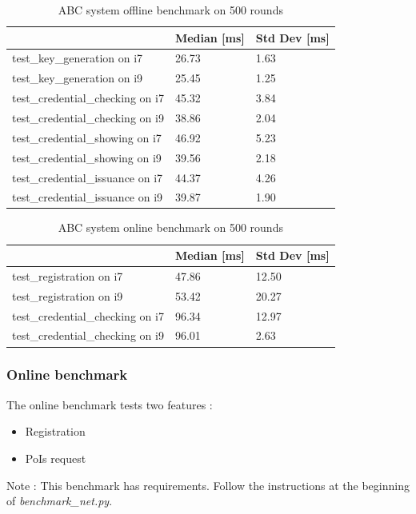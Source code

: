 \documentclass[10pt,conference,compsocconf]{IEEEtran}
\begin{document}
\begin{table}[]
\centering
\begin{tabular}{|l|l|l|}
\hline
                                 & Median [ms] & Std Dev [ms] \\ \hline
test\_key\_generation on i7      & 26.73  & 1.63    \\ \hline
test\_key\_generation on i9      & 25.45  & 1.25    \\ \hline
test\_credential\_checking on i7 & 45.32  & 3.84    \\ \hline
test\_credential\_checking on i9 & 38.86  & 2.04    \\ \hline
test\_credential\_showing on i7  & 46.92  & 5.23    \\ \hline
test\_credential\_showing on i9  & 39.56  & 2.18    \\ \hline
test\_credential\_issuance on i7 & 44.37  & 4.26    \\ \hline
test\_credential\_issuance on i9 & 39.87  & 1.90    \\ \hline
\end{tabular}
\caption{ABC system offline benchmark on 500 rounds}
\label{benchoffline}
\end{table}

\begin{table}[]
\centering
\begin{tabular}{|l|l|l|}
\hline
                                 & Median [ms] & Std Dev [ms] \\ \hline
test\_registration on i7         & 47.86  & 12.50   \\ \hline
test\_registration on i9         & 53.42  & 20.27   \\ \hline
test\_credential\_checking on i7 & 96.34  & 12.97   \\ \hline
test\_credential\_checking on i9 & 96.01  & 2.63    \\ \hline
\end{tabular}
\caption{ABC system online benchmark on 500 rounds}
\label{benchonline}
\end{table}


\subsubsection{Online benchmark}
The online benchmark tests two features :
\begin{itemize}
    \item Registration
    \item PoIs request
\end{itemize}
Note : This benchmark has requirements. Follow the instructions at the beginning of \textit{benchmark\_net.py}.
\end{document}
